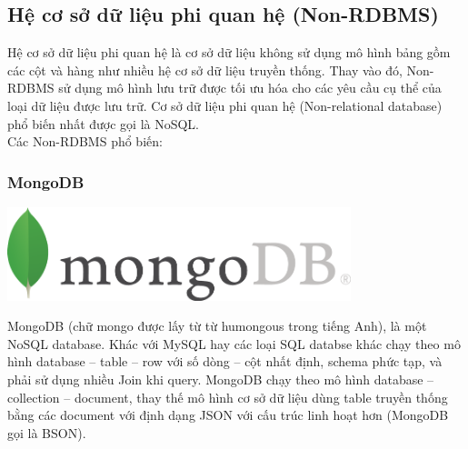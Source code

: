 \subsection{Hệ cơ sở dữ liệu phi quan hệ (Non-RDBMS)}
Hệ cơ sở dữ liệu phi quan hệ là cơ sở dữ liệu không sử dụng mô hình bảng gồm các cột và hàng như nhiều hệ cơ sở dữ liệu truyền thống. Thay vào đó, Non-RDBMS sử dụng mô hình lưu trữ được tối ưu hóa cho các yêu cầu cụ thể của loại dữ liệu được lưu trữ. Cơ sở dữ liệu phi quan hệ (Non-relational database) phổ biến nhất được gọi là NoSQL.\\
Các Non-RDBMS phổ biến:
\subsubsection{MongoDB}
\begin{center}
  \captionsetup{type=figure}
    \includegraphics[width=10cm]{image/mongo.png}
\end{center}

MongoDB (chữ mongo được lấy từ từ humongous trong tiếng Anh), là một NoSQL database. Khác với MySQL hay các loại SQL databse khác chạy theo mô hình database – table – row với số dòng – cột nhất định, schema phức tạp, và phải sử dụng nhiều Join khi query. MongoDB chạy theo mô hình database – collection – document, thay thế mô hình cơ sở dữ liệu dùng table truyền thống bằng các document với định dạng JSON với cấu trúc linh hoạt hơn (MongoDB gọi là BSON).

